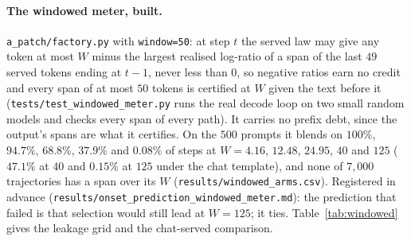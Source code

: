 \paragraph{The windowed meter, built.}\label{app:windowed}
\texttt{a\_patch/\allowbreak factory.py} with \texttt{window=50}: at step $t$ the served law may give any
token at most $W$ minus the largest realised log-ratio of a span of the last $49$ served tokens ending at
$t-1$, never less than $0$, so negative ratios earn no credit and every span of at most $50$ tokens is
certified at $W$ given the text before it (\texttt{tests/\allowbreak test\_\allowbreak windowed\_\allowbreak meter.py} runs the real decode loop on two small random models and checks every span of every path). It
carries no prefix debt, since the output's spans are what it certifies. On the $500$ prompts it blends on
$100\%$, $94.7\%$, $68.8\%$, $37.9\%$ and $0.08\%$ of steps at $W = 4.16$, $12.48$, $24.95$, $40$ and $125$
($47.1\%$ at $40$ and $0.15\%$ at $125$ under the chat template), and none of $7{,}000$ trajectories has a
span over its $W$ (\texttt{results/\allowbreak windowed\_\allowbreak arms.csv}). Registered in advance
(\texttt{results/\allowbreak onset\_\allowbreak prediction\_\allowbreak windowed\_\allowbreak meter.md}):
the prediction that failed is that selection would still lead at $W=125$; it ties. Table~\ref{tab:windowed}
gives the leakage grid and the chat-served comparison.

